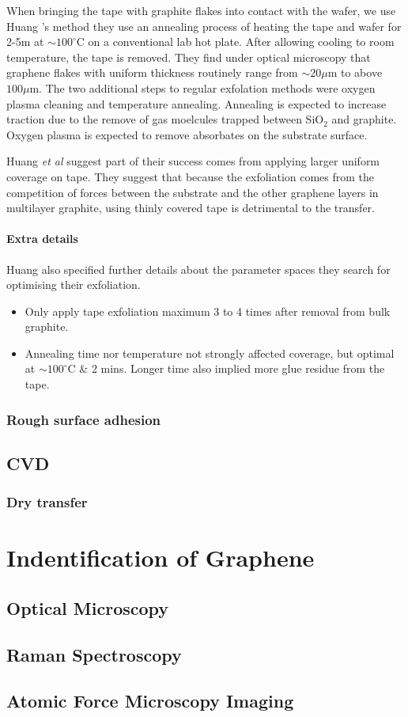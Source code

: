 \documentclass[../Matt_Gebert_Honours_Thesis.tex]{subfiles}
\begin{document}
When bringing the tape with graphite flakes into contact with the \silicondioxide wafer, we use Huang \etal's method  they  use an annealing process of heating the tape and wafer for 2-5m at $\sim 100^\circ$C on a conventional lab hot plate. After allowing cooling to room temperature, the tape is removed. They find under optical microscopy that graphene flakes with uniform thickness routinely range from $\sim 20\mu$m to above $100\mu$m. The two additional steps to regular exfolation methods were oxygen plasma cleaning and temperature annealing. Annealing is expected to increase traction due to the remove of gas moelcules trapped between SiO$_2$ and graphite. Oxygen plasma is expected to remove absorbates on the substrate surface. 

Huang \textit{et al} suggest part of their success comes from applying larger uniform coverage on tape. They suggest that because the exfoliation comes from the competition of forces between the substrate and the other graphene layers in multilayer graphite, using thinly covered tape is detrimental to the transfer.



\paragraph{Extra details} Huang \etal also specified further details about the parameter spaces they search for optimising their exfoliation. 
\begin{itemize}
	\itemsep0em 
	\item Only apply tape exfoliation maximum 3 to 4 times after removal from bulk graphite.
	\item Annealing time nor temperature not strongly affected coverage, but optimal at $\sim100^\circ$C \& 2 mins. Longer time also implied more glue residue from the tape.
\end{itemize}

\subsubsection{Rough surface adhesion}


\subsection{CVD}\label{sec:CVD}

\subsubsection{Dry transfer}


\section{Indentification of Graphene}
\subsection{Optical Microscopy}

\subsection{Raman Spectroscopy}

\subsection{Atomic Force Microscopy Imaging}
\end{document}
